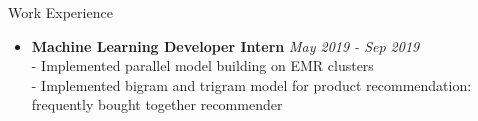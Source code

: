 \documentclass{resume} %
\begin{document}
\begin{rSection}{Work Experience}
\begin{itemize}[label={}, leftmargin=0.6em]
        \\- Researched and implemented Transformer-based query retrieval system for long queries
        \\- Implemented product content embedding based on product description and visual representation
        \\- Participate in ML recruitment events and conduct technical interviews
        \\- Initiated and organized \textit{paper club}, a bi-weekly workshop on the recent developments in ML
        \\- Represented Coveo at NLP events such as RALI, MILA, MTL-NLP, etc.
        \vspace{-.25em}
    \item \textbf{\small Machine Learning Developer Intern} \hfill {\em May 2019 - Sep 2019}
        \\- Implemented parallel model building on EMR clusters
        \\- Implemented bigram and trigram model for product recommendation: frequently bought together recommender
\end{itemize}
\end{rSection}
\end{document}
